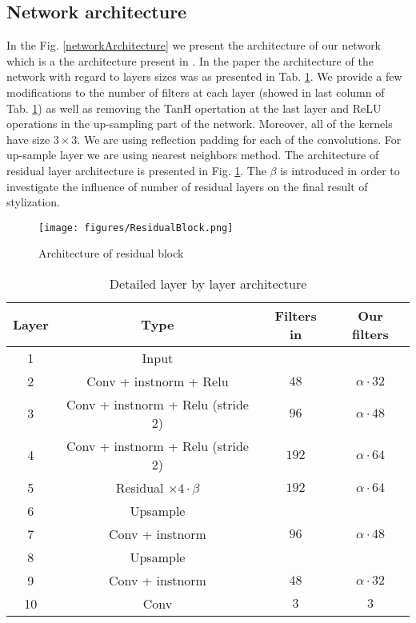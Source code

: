 \documentclass[a4paper,conference]{IEEEtran}
\newcommand{\ResidualLayerNumber}{\beta}
\begin{document}
\subsection{Network architecture}

In the Fig. \ref{networkArchitecture} we present the architecture of our network which is a the architecture present in \cite{Reconet}. In the \cite{Reconet} paper the architecture of the network with regard to layers sizes was as presented in Tab. \ref{tableWithArchitecture}. We provide a few modifications to the number of filters at each layer (showed in last column of Tab. \ref{tableWithArchitecture})  as well as removing the TanH opertation at the last layer and ReLU operations in the up-sampling part of the network. Moreover, all of the kernels have size $3 \times 3$. We are using reflection padding for each of the convolutions. For up-sample layer we are using nearest neighbors method. The architecture of residual layer architecture is presented in Fig. \ref{residualBlockArchitecture}. The $\ResidualLayerNumber$ is introduced in order to investigate the influence of number of residual layers on the final result of stylization. 


\begin{figure}[ht]
\caption{Architecture of residual block}
\label{residualBlockArchitecture}
\centering
\texttt{[image: figures/ResidualBlock.png]}
\end{figure}



\begin{table}[ht]
\scriptsize
\caption{Detailed layer by layer architecture}
\label{tableWithArchitecture}
\centering
\begin{tabular}{cccc}
\hline 
Layer & Type & Filters in \cite{Reconet} & Our filters \\ 
\hline 
1  & Input &  &  \\ 
\hline 
2 & Conv + instnorm + Relu & $ 48$  & $\alpha \cdot 32$ \\ 
\hline 
3 & Conv + instnorm + Relu (stride 2) & $96$ & $\alpha \cdot 48$ \\ 
\hline 
4& Conv + instnorm + Relu (stride 2) & $192$ & $\alpha \cdot 64$ \\ 
\hline 
5 & Residual  $\times  4 \cdot \ResidualLayerNumber$   & $192$ &  $\alpha \cdot 64$ \\ 
\hline
6 & Upsample & &\\
\hline 
7 & Conv + instnorm & $96$ & $\alpha \cdot 48$ \\ 
\hline 
8 & Upsample & &\\
\hline 
9 & Conv + instnorm & $48$ & $\alpha \cdot 32$ \\ 
\hline 
10 & Conv  & $3$ & $3$ \\ 
\hline 
\end{tabular} 
\end{table}
\end{document}
